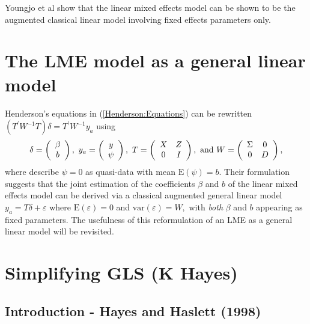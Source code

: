 \documentclass[Main.tex]{subfiles}
\begin{document}
Youngjo et al show that the linear mixed effects model can be
shown to be the augmented classical linear model involving fixed
effects parameters only.
\section{The LME model as a general linear model}
Henderson's equations in (\ref{Henderson:Equations}) can be rewritten $( T^\prime W^{-1} T ) \delta = T^\prime W^{-1} y_{a} $ using
\[
\delta = \left(\begin{array}{c}\beta \\ b \end{array}\right),
\ y_{a} = \left(\begin{array}{c}
y \cr \psi
\end{array}\right),
\ T = \left(\begin{array}{cc}
X & Z  \\
0 & I
\end{array}\right),
\ \textrm{and} \ W = \left(\begin{array}{cc}
\Sigma & 0  \cr
0 &  D \end{array}\right),
\]
where \cite{Lee:Neld:Pawi:2006} describe $\psi = 0$ as quasi-data with mean $\mathrm{E}(\psi) = b.$ Their formulation suggests that the joint estimation of the coefficients $\beta$ and $b$ of the linear mixed effects model can be derived via a classical augmented general linear model $y_{a} = T\delta + \varepsilon$ where $\mathrm{E}(\varepsilon) = 0$ and $\mathrm{var}(\varepsilon) = W,$ with \emph{both} $\beta$ and $b$ appearing as fixed parameters. The usefulness of this reformulation of an LME as a general linear model will be revisited.






\section{Simplifying GLS (K Hayes)}

\subsection{Introduction - Hayes and Haslett (1998)}
\end{document}
